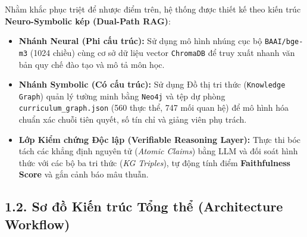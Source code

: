 \documentclass[a4paper,12pt]{article}
\begin{document}
Nhằm khắc phục triệt để nhược điểm trên, hệ thống được thiết kế theo kiến trúc \textbf{Neuro-Symbolic kép (Dual-Path RAG)}:
\begin{itemize}[noitemsep]
    \item \textbf{Nhánh Neural (Phi cấu trúc):} Sử dụng mô hình nhúng cục bộ \texttt{BAAI/bge-m3} (1024 chiều) cùng cơ sở dữ liệu vector \texttt{ChromaDB} để truy xuất nhanh văn bản quy chế đào tạo và mô tả môn học.
    \item \textbf{Nhánh Symbolic (Có cấu trúc):} Sử dụng Đồ thị tri thức (\texttt{Knowledge Graph}) quản lý tường minh bằng \texttt{Neo4j} và tệp dự phòng \texttt{curriculum\_graph.json} (560 thực thể, 747 mối quan hệ) để mô hình hóa chuẩn xác chuỗi tiên quyết, số tín chỉ và giảng viên phụ trách.
    \item \textbf{Lớp Kiểm chứng Độc lập (Verifiable Reasoning Layer):} Thực thi bóc tách các khẳng định nguyên tử (\textit{Atomic Claims}) bằng LLM và đối soát hình thức với các bộ ba tri thức (\textit{KG Triples}), tự động tính điểm \textbf{Faithfulness Score} và gắn cảnh báo mâu thuẫn.
\end{itemize}

\subsection{1.2. Sơ đồ Kiến trúc Tổng thể (Architecture Workflow)}
\end{document}
